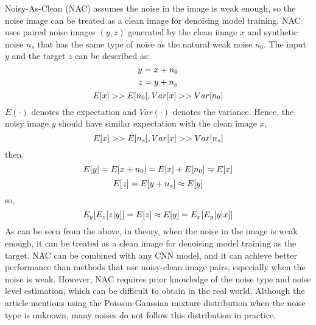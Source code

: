 \documentclass[conference]{IEEEtran}
\begin{document}
Noisy-As-Clean (NAC) \cite{xu2020noisy} assumes the noise in the image is weak enough, so the noise image can be treated as a clean image for denoising model training. NAC uses paired noise images $(y, z)$ generated by the clean image $x$ and synthetic noise $n_s$ that has the same type of noise as the natural weak noise $n_0$. The input
$y$ and the target $z$ can be described as:
\begin{equation}
	\setlength{\abovedisplayskip}{0pt}
	\setlength{\belowdisplayskip}{0pt}
	y = x+ n_0
	\label{eq:NAC_1}
\end{equation}
\begin{equation}
	\setlength{\abovedisplayskip}{0pt}
	\setlength{\belowdisplayskip}{0pt}
	z=y+n_s
	\label{eq:NAC_2}
\end{equation}
\begin{equation}
	\setlength{\abovedisplayskip}{0pt}
	\setlength{\belowdisplayskip}{0pt}
	E[x] >> E[n_0], Var[x]>> Var[n_0]
	\label{eq:NAC_3}
\end{equation}
$E(\cdot)$ denotes the expectation and $Var(\cdot)$ denotes the variance. Hence, the noisy image $y$ should have similar expectation with the clean image $x$,
\begin{equation}
	\setlength{\abovedisplayskip}{0pt}
	\setlength{\belowdisplayskip}{0pt}
	E[x] >> E[n_s], Var[x]>> Var[n_s]
	\label{eq:NAC_4}
\end{equation}
then,
\begin{equation}
	\setlength{\abovedisplayskip}{0pt}
	\setlength{\belowdisplayskip}{0pt}
	E[y]=E[x + n_0]=E[x]+E[n_0] \approx E[x]
	\label{eq:NAC_5}
\end{equation}
\begin{equation}
	\setlength{\abovedisplayskip}{0pt}
	\setlength{\belowdisplayskip}{0pt}
	E[z] = E[y+n_s] \approx E[y]
	\label{eq:NAC_6}
\end{equation}
so,
\begin{equation}
	\setlength{\abovedisplayskip}{0pt}
	\setlength{\belowdisplayskip}{0pt}
	E_y[E_z[z|y]] = E[z] \approx E[y] = E_x[E_y[y|x]]
	\label{eq:NAC_7}
\end{equation}
As can be seen from the above, in theory, when the noise in the image is weak enough, it can be treated as a clean image for denoising model training as the target.
NAC can be combined with any CNN model, and it can achieve better performance than methods that use noisy-clean image pairs, especially when the noise is weak. However, NAC requires prior knowledge of the noise type and noise level estimation, which can be difficult to obtain in the real world. Although the article mentions using the Poisson-Gaussian mixture distribution when the noise type is unknown, many noises do not follow this distribution in practice. 
\end{document}
